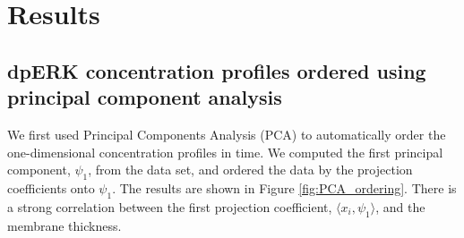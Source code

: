 \documentclass[10pt]{article}
\begin{document}
\section*{Results}

\subsection*{dpERK concentration profiles ordered using principal component analysis}

We first used Principal Components Analysis (PCA) to automatically order the one-dimensional concentration profiles in time. 
%
We computed the first principal component, $\psi_1$, from the data set, and ordered the data by the projection coefficients onto $\psi_1$. 
%
The results are shown in Figure \ref{fig:PCA_ordering}.
%
There is a strong correlation between the first projection coefficient, $\langle x_i, \psi_1 \rangle$, and the membrane thickness.
\end{document}
